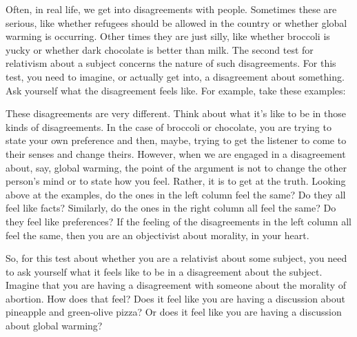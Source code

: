 Often, in real life, we get into disagreements with people. Sometimes these are serious, like whether refugees should be allowed in the country or whether global warming is occurring. Other times they are just silly, like whether broccoli is yucky or whether dark chocolate is better than milk. The second test for relativism about a subject concerns the nature of such disagreements. For this test, you need to  imagine, or actually get into, a disagreement about something. Ask yourself what the disagreement feels like. For example, take these examples:

These disagreements are very different. Think about what it’s like to be in those kinds of disagreements. In the case of broccoli or chocolate, you are trying to state your own preference and then, maybe, trying to get the listener to come to their senses and change theirs. However, when we are engaged in a disagreement about, say, global warming, the point of the argument is not to change the other person’s mind or to state how you feel. Rather, it is to get at the truth. Looking above at the examples, do the ones in the left column feel the same? Do they all feel like facts? Similarly, do the ones in the right column all feel the same? Do they feel like preferences? If the feeling of the disagreements in the left column all feel the same, then you are an objectivist about morality, in your heart.  

So, for this test about whether you are a relativist about some subject, you need to ask yourself what it feels like to be in a disagreement about the subject. Imagine that you are having a disagreement with someone about the morality of abortion. How does that feel? Does it feel like you are having a discussion about pineapple and green-olive pizza? Or does it feel like you are having a discussion about global warming?

